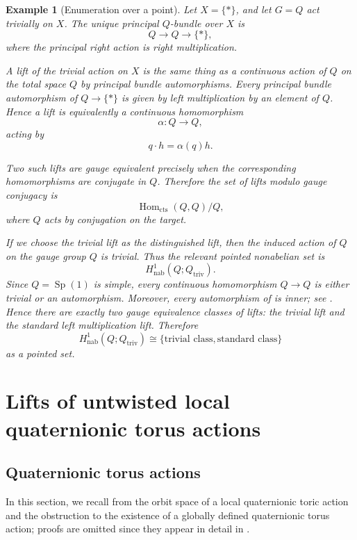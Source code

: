 \documentclass[11pt,a4paper]{article}
\numberwithin{equation}{section}
\newtheorem{example}[definition]{Example}
\theoremstyle{named}
\begin{document}
\begin{example}[Enumeration over a point]
\label{ex:enumeration-point}
Let \(X=\{\ast\}\), and let \(G=Q\) act trivially on \(X\). The unique principal \(Q\)-bundle over \(X\) is
\[
Q\longrightarrow Q\longrightarrow \{\ast\},
\]
where the principal right action is right multiplication.

A lift of the trivial action on \(X\) is the same thing as a continuous action of \(Q\) on the total space \(Q\) by principal bundle automorphisms. Every principal bundle automorphism of \(Q\to\{\ast\}\) is given by left multiplication by an element of \(Q\). Hence a lift is equivalently a continuous homomorphism
\[
\alpha:Q\longrightarrow Q,
\]
acting by
\[
q\cdot h=\alpha(q)h.
\]

Two such lifts are gauge equivalent precisely when the corresponding homomorphisms are conjugate in \(Q\). Therefore the set of lifts modulo gauge conjugacy is
\[
\operatorname{Hom}_{\mathrm{cts}}(Q,Q)/Q,
\]
where \(Q\) acts by conjugation on the target.

If we choose the trivial lift as the distinguished lift, then the induced action of \(Q\) on the gauge group \(Q\) is trivial. Thus the relevant pointed nonabelian set is
\[
H^1_{\mathrm{nab}}(Q;Q_{\mathrm{triv}}).
\]
Since \(Q=\operatorname{Sp}(1)\) is simple, every continuous homomorphism \(Q\to Q\) is either trivial or an automorphism. Moreover, every automorphism of is inner; see \cite[p.25]{ho}. Hence there are exactly two gauge equivalence classes of lifts: the trivial lift and the standard left multiplication lift. Therefore
\[
H^1_{\mathrm{nab}}(Q;Q_{\mathrm{triv}})
\cong
\{\text{trivial class},\text{standard class}\}
\]
as a pointed set.
\end{example}


\section{Lifts of untwisted local quaternionic torus actions}
\label{sec:untwisting}

\subsection{Quaternionic torus actions}
\label{subsec:orbit-space-globalization}

In this section, we recall from \cite{bg25} the orbit space of a local quaternionic toric action and the obstruction to the existence of a globally defined quaternionic torus action; proofs are omitted since they appear in detail in \cite{bg25}.
\end{document}
